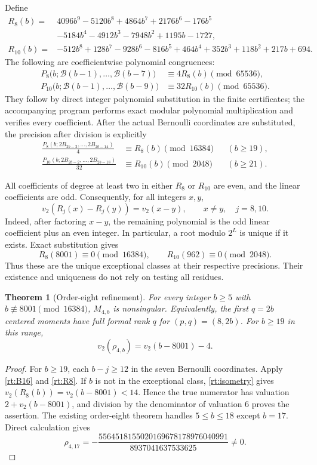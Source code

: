 \documentclass[11pt,a4paper]{article}
\numberwithin{equation}{section}
\newtheorem{theorem}{Theorem}[section]
\theoremstyle{definition}
\theoremstyle{remark}
\begin{document}
Define
\begin{align*}
 R_8(b)={}&4096b^9-5120b^8+4864b^7+2176b^6-176b^5\\
 &-5184b^4-4912b^3-7948b^2+1195b-1727,\\
 R_{10}(b)={}&-512b^8+128b^7-928b^6-816b^5+464b^4
                  +352b^3+118b^2+217b+694.
\end{align*}
The following are coefficientwise polynomial congruences:
\begin{align}
 P_8\bigl(b;\mathcal B(b-1),\ldots,\mathcal B(b-7)\bigr)
       &\equiv4R_8(b)\pmod{65536},\label{rt:R8}\\
 P_{10}\bigl(b;\mathcal B(b-1),\ldots,\mathcal B(b-9)\bigr)
       &\equiv32R_{10}(b)\pmod{65536}.\label{rt:R10}
\end{align}
They follow by direct integer polynomial substitution in the finite
certificates; the accompanying program performs exact modular
polynomial multiplication and verifies every coefficient. After the
actual Bernoulli coordinates are substituted, the precision after division
is explicitly
\begin{align*}
 \frac{P_8(b;2B_{2b-2},\ldots,2B_{2b-14})}{4}
       &\equiv R_8(b)\pmod{16384} &&(b\ge19),\\
 \frac{P_{10}(b;2B_{2b-2},\ldots,2B_{2b-18})}{32}
       &\equiv R_{10}(b)\pmod{2048} &&(b\ge21).
\end{align*}

All coefficients of degree at least two in either $R_8$ or $R_{10}$
are even, and the linear coefficients are odd. Consequently, for
all integers $x,y$,
\begin{equation}\label{rt:isometry}
 v_2(R_j(x)-R_j(y))=v_2(x-y),\qquad x\ne y,\quad j=8,10.
\end{equation}
Indeed, after factoring $x-y$, the remaining polynomial is the odd
linear coefficient plus an even integer. In particular, a root
modulo $2^L$ is unique if it exists. Exact substitution gives
\[
 R_8(8001)\equiv0\pmod{16384},\qquad
 R_{10}(962)\equiv0\pmod{2048}.
\]
Thus these are the unique exceptional classes at their respective
precisions. Their existence and uniqueness do not rely on testing
all residues.

\begin{theorem}[Order-eight refinement]\label{rt:rank8}
For every integer $b\ge5$ with $b\not\equiv8001\pmod{16384}$,
$M_{4,b}$ is nonsingular. Equivalently, the first $q=2b$ centered
moments have full formal rank $q$ for $(p,q)=(8,2b)$. For $b\ge19$
in this range,
\[
             v_2(\rho_{4,b})=v_2(b-8001)-4.
\]
\end{theorem}
\begin{proof}
For $b\ge19$, each $b-j\ge12$ in the seven Bernoulli coordinates.
Apply \eqref{rt:B16} and \eqref{rt:R8}. If $b$ is not in the
exceptional class, \eqref{rt:isometry} gives
$v_2(R_8(b))=v_2(b-8001)<14$. Hence the true numerator has
valuation $2+v_2(b-8001)$, and division by the denominator of
valuation 6 proves the assertion. The existing order-eight theorem
handles $5\le b\le18$ except $b=17$. Direct calculation gives
\[
 \rho_{4,17}=-\frac{5564518155020169678178976040991}
                         {8937041637533625}\ne0.
\]
\end{proof}
\end{document}

